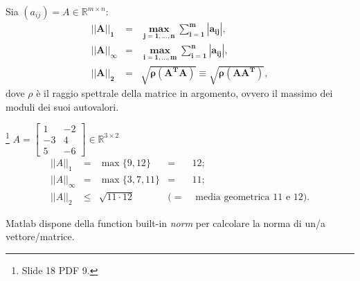 \noindent Sia $(a_{ij})=A\in\mathbb{R}^{m\times n}:$
\begin{equation*}
    \begin{matrix}
        \boldsymbol {||A||_1} &\boldsymbol=& \boldsymbol{\underset{j=1,\hdots, n}{\max}\sum_{i=1}^m|a_{ij}|},\\
        \boldsymbol {||A||_\infty} &\boldsymbol=& \boldsymbol{\underset{i=1,\hdots, m}{\max}\sum_{i=1}^n|a_{ij}|},\\
        \boldsymbol {||A||_2} &\boldsymbol{=} & \boldsymbol{\sqrt{\rho(A^T A)} \equiv \sqrt{\rho (AA^T)}},
    \end{matrix}
\end{equation*}
dove $\rho$ è il raggio spettrale della matrice in argomento, ovvero il massimo dei moduli dei suoi autovalori.

\begin{example}\footnote{Slide 18 PDF 9.}
    $A=\begin{bmatrix}
        1 & -2\\
        -3 & 4\\
        5 & -6
    \end{bmatrix}\in\mathbb{R}^{3\times 2}$
    \begin{equation*}
        \begin{matrix}
            ||A||_1 &=& \max\{9,12\} &=& 12;\\
            ||A||_\infty &=& \max\{3,7,11\} &=& 11;\\
            ||A||_2 &\leq& \sqrt{11\cdot 12} &(=& \text{ media geometrica 11 e 12).}
        \end{matrix}
    \end{equation*}
\end{example}

\begin{remark}
    Matlab dispone della function built-in \textit{norm} per calcolare la norma di un/a vettore/matrice.
\end{remark}